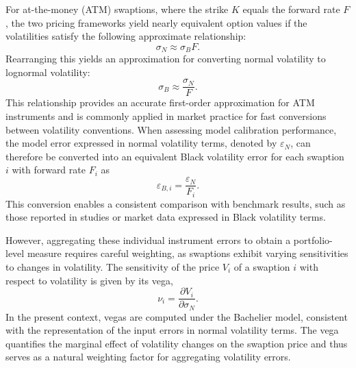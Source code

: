 {For at-the-money (ATM) swaptions, where the strike \( K \) equals the forward rate \( F \), the two pricing frameworks yield nearly equivalent option values if the volatilities satisfy the following approximate relationship:
\begin{equation}
	\sigma_N \approx \sigma_B F.
\end{equation}
Rearranging this yields an approximation for converting normal volatility to lognormal volatility:
\begin{equation}
	\sigma_B \approx \frac{\sigma_N}{F}.
\end{equation}
This relationship provides an accurate first-order approximation for ATM instruments and is commonly applied in market practice for fast conversions between volatility conventions.
\label{subsubsec:conversion_normal_to_black_vol_errors}
When assessing model calibration performance, the model error expressed in normal volatility terms, denoted by \( \varepsilon_N \), can therefore be converted into an equivalent Black volatility error for each swaption \( i \) with forward rate \( F_i \) as
\begin{equation}
	\varepsilon_{B,i} = \frac{\varepsilon_N}{F_i}.
\end{equation}
This conversion enables a consistent comparison with benchmark results, such as those reported in studies or market data expressed in Black volatility terms.

However, aggregating these individual instrument errors to obtain a portfolio-level measure requires careful weighting, as swaptions exhibit varying sensitivities to changes in volatility. The sensitivity of the price \( V_i \) of a swaption \( i \) with respect to volatility is given by its vega,
\begin{equation}
	\nu_i = \frac{\partial V_i}{\partial \sigma_N}.
\end{equation}
In the present context, vegas are computed under the Bachelier model, consistent with the representation of the input errors in normal volatility terms. The vega quantifies the marginal effect of volatility changes on the swaption price and thus serves as a natural weighting factor for aggregating volatility errors.

}
